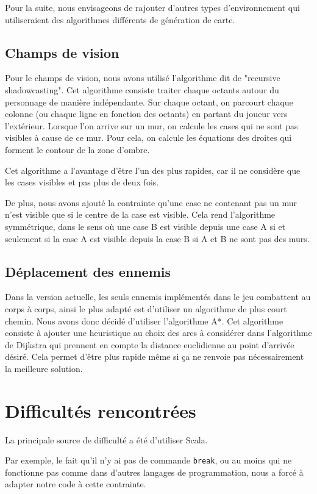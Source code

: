 \documentclass[10pt,a4paper]{article}
\begin{document}
Pour la suite, nous envisageons de rajouter d'autres types d'environnement qui utiliseraient des algorithmes différents de génération de carte.

\subsection{Champs de vision}

Pour le champs de vision, nous avons utilisé l'algorithme dit de "recursive shadowcasting". Cet algorithme consiste traiter chaque octants autour du personnage de manière indépendante. Sur chaque octant, on parcourt chaque colonne (ou chaque ligne en fonction des octants) en partant du joueur vers l'extérieur. Lorsque l'on arrive sur un mur, on calcule les cases qui ne sont pas visibles à cause de ce mur. Pour cela, on calcule les équations des droites qui forment le contour de la zone d'ombre.

Cet algorithme a l'avantage d'être l'un des plus rapides, car il ne considère que les cases visibles et pas plus de deux fois.

De plus, nous avons ajouté la contrainte qu'une case ne contenant pas un mur n'est visible que si le centre de la case est visible. Cela rend l'algorithme symmétrique, dans le sens où une case B est visible depuis une case A si et seulement si la case A est visible depuis la case B si A et B ne sont pas des murs.

\subsection{Déplacement des ennemis}

Dans la version actuelle, les seuls ennemis implémentés dans le jeu combattent au corps à corps, ainsi le plus adapté est d'utiliser un algorithme de plus court chemin. Nous avons donc décidé d'utiliser l'algorithme A*. Cet algorithme consiste à ajouter une heuristique au choix des arcs à considérer dans l'algorithme de Dijkstra qui prennent en compte la distance euclidienne au point d'arrivée désiré. Cela permet d'être plus rapide même si ça ne renvoie pas nécessairement la meilleure solution.

\section{Difficultés rencontrées}

La principale source de difficulté a été d'utiliser Scala.

Par exemple, le fait qu'il n'y ai pas de commande \texttt{break}, ou au moins qui ne fonctionne pas comme dans d'autres langages de programmation, nous a forcé à adapter notre code à cette contrainte.
\end{document}
